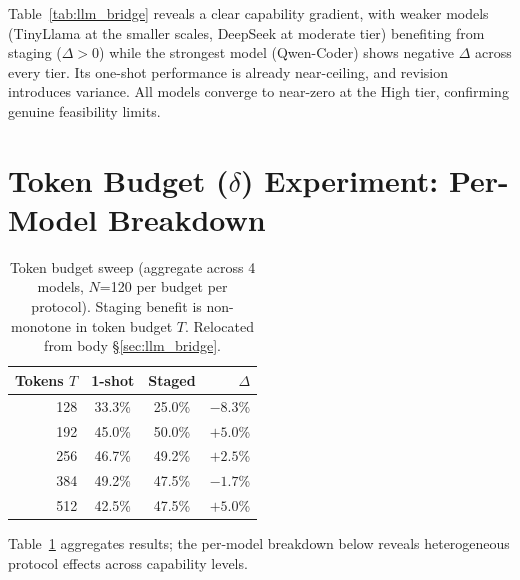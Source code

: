 \documentclass{article}
\theoremstyle{plain}
\theoremstyle{definition}
\theoremstyle{remark}
\begin{document}
Table~\ref{tab:llm_bridge} reveals a clear capability gradient, with weaker models (TinyLlama at the smaller scales, DeepSeek at moderate tier) benefiting from staging ($\Delta > 0$) while the strongest model (Qwen-Coder) shows negative $\Delta$ across every tier. Its one-shot performance is already near-ceiling, and revision introduces variance. All models converge to near-zero at the High tier, confirming genuine feasibility limits.

\section{Token Budget ($\delta$) Experiment: Per-Model Breakdown}\label{app:delta_capacity}

\begin{table}[ht]
\centering
\small
\caption{Token budget sweep (aggregate across 4 models, $N$=120 per budget per protocol). Staging benefit is non-monotone in token budget $T$. Relocated from body \S\ref{sec:llm_bridge}.}
\label{tab:delta_capacity}
\begin{tabular}{rccr}
\toprule
Tokens $T$ & 1-shot & Staged & $\Delta$ \\
\midrule
128 & 33.3\% & 25.0\% & $-8.3$\% \\
192 & 45.0\% & 50.0\% & $+5.0$\% \\
256 & 46.7\% & 49.2\% & $+2.5$\% \\
384 & 49.2\% & 47.5\% & $-1.7$\% \\
512 & 42.5\% & 47.5\% & $+5.0$\% \\
\bottomrule
\end{tabular}
\end{table}

Table~\ref{tab:delta_capacity} aggregates results; the per-model breakdown below reveals heterogeneous protocol effects across capability levels.

\begin{table}[ht]
\centering
\small
\caption{Per-model staging delta by token budget. Qwen-Coder shows negative $\Delta$: staging is overhead at ceiling capability. DeepSeek shows the predicted pattern: benefit peaks at mid-range $\delta$.}
\label{tab:delta_capacity_model}
\end{table}
\end{document}

